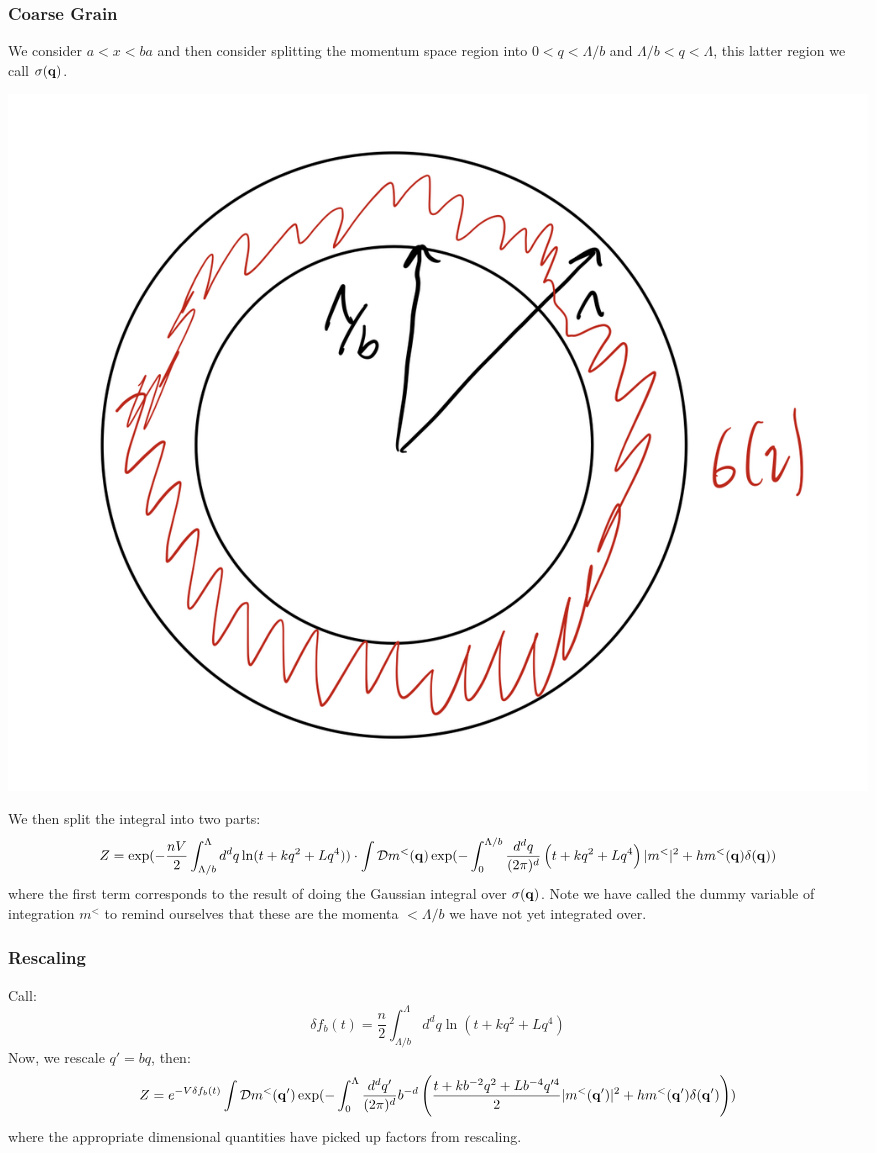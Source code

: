 \subsubsection*{Coarse Grain}
We consider $a < x < ba$ and then consider splitting the momentum space region into $0 < q < \Lambda/b$ and $\Lambda/b < q < \Lambda$, this latter region we call $\sigma(\mathbf{q})$. 

\begin{center}
    \includegraphics[scale=0.3]{Lectures/Figures/lec8-sphere-split.png}
\end{center}

We then split the integral into two parts:
\begin{equation}
    Z= \exp(-\frac{nV}{2}\int_{\Lambda/b}^\Lambda d^dq \ln(t + kq^2 + Lq^4)) \cdot \int \mathcal{D}m^<(\mathbf{q})\exp(-\int_0^{\Lambda/b}\frac{d^dq}{(2\pi)^d}\left(t + kq^2 + Lq^4\right)\lvert m^< \rvert^2 + hm^<(\mathbf{q})\delta(\mathbf{q}))
\end{equation}
where the first term corresponds to the result of doing the Gaussian integral over $\sigma(\mathbf{q})$. Note we have called the dummy variable of integration $m^<$ to remind ourselves that these are the momenta $< \Lambda/b$ we have not yet integrated over.
\subsubsection*{Rescaling}
Call:
\begin{equation}
    \delta f_b(t) = \frac{n}{2}\int_{\Lambda/b}^\Lambda d^dq \ln(t + kq^2 + Lq^4)
\end{equation}
Now, we rescale $q' = bq$, then:
\begin{equation}
    Z = e^{-V\delta f_b(t)}\int \mathcal{D}m^<(\mathbf{q}')\exp(-\int_0^\Lambda \frac{d^dq'}{(2\pi)^d}b^{-d}\left(\frac{t + kb^{-2}q^2 + Lb^{-4}q'^{4}}{2}\lvert m^<(\mathbf{q}') \rvert^2 + hm^<(\mathbf{q}')\delta(\mathbf{q'})\right))
\end{equation}
where the appropriate dimensional quantities have picked up factors from rescaling.

